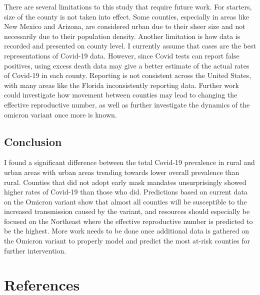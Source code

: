 \documentclass[
  12pt,
]{article}
\begin{document}
There are several limitations to this study that require future work. For starters, size of the county is not taken into effect. Some counties, especially in areas like New Mexico and Arizona, are considered urban due to their sheer size and not necessarily due to their population density. Another limitation is how data is recorded and presented on county level. I currently assume that cases are the best representations of Covid-19 data. However, since Covid tests can report false positives, using excess death data may give a better estimate of the actual rates of Covid-19 in each county. Reporting is not consistent across the United States, with many areas like the Florida inconsistently reporting data. Further work could investigate how movement between counties may lead to changing the effective reproductive number, as well as further investigate the dynamics of the omicron variant once more is known.

\hypertarget{conclusion}{%
\subsection{Conclusion}\label{conclusion}}

I found a significant difference between the total Covid-19 prevalence in rural and urban areas with urban areas trending towards lower overall prevalence than rural. Counties that did not adopt early mask mandates unsurprisingly showed higher rates of Covid-19 than those who did. Predictions based on current data on the Omicron variant show that almost all counties will be susceptible to the increased transmission caused by the variant, and resources should especially be focused on the Northeast where the effective reproductive number is predicted to be the highest. More work needs to be done once additional data is gathered on the Omicron variant to properly model and predict the most at-risk counties for further intervention.

\hypertarget{references}{%
\section{References}\label{references}}
\end{document}
